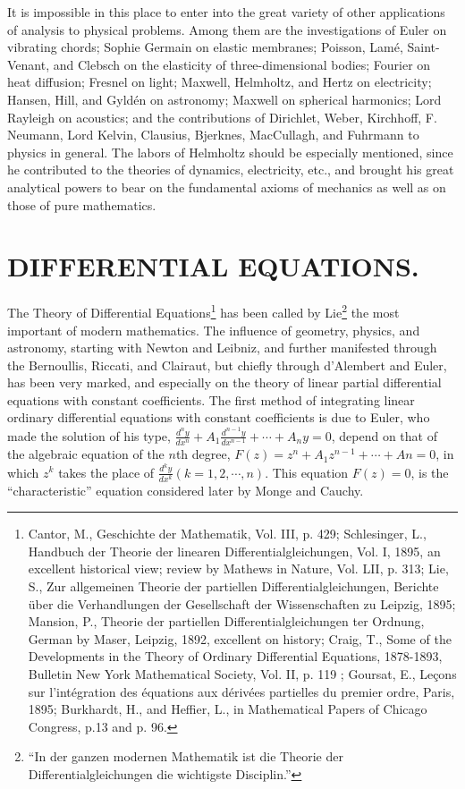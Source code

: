 \documentclass[oneside]{book}
\begin{document}
It is impossible in this place to enter into the great variety of
other applications of analysis to physical problems. Among them are
the investigations of Euler on vibrating chords; Sophie Germain on
elastic membranes; Poisson, Lam\'e, Saint-Venant, and Clebsch on
the elasticity of three-dimensional bodies; Fourier on heat
diffusion; Fresnel on light; Maxwell, Helmholtz, and Hertz on
electricity; Hansen, Hill, and Gyld\'en on astronomy; Maxwell on
spherical harmonics; Lord Rayleigh on acoustics; and the
contributions of Dirichlet, Weber, Kirchhoff, F. Neumann, Lord
Kelvin, Clausius, Bjerknes, MacCullagh, and Fuhrmann to physics in
general. The labors of Helmholtz should be especially mentioned,
since he contributed to the theories of dynamics, electricity, etc.,
and brought his great analytical powers to bear on the fundamental
axioms of mechanics as well as on those of pure mathematics.

\chapter{DIFFERENTIAL EQUATIONS.}

The Theory of Differential Equations\footnote{Cantor, M.,
Geschichte der Mathematik, Vol. III, p. 429; Schlesinger, L.,
Handbuch der
Theorie der linearen Differentialgleichungen, Vol. I, 1895, an
excellent historical view; review by Mathews in Nature, Vol. LII,
p. 313; Lie, S., Zur allgemeinen Theorie der partiellen
Differentialgleichungen, Berichte \"uber die Verhandlungen der
Gesellschaft der Wissenschaften zu Leipzig, 1895; Mansion, P.,
Theorie der partiellen Differentialgleichungen ter Ordnung, German
by Maser, Leipzig, 1892, excellent on history; Craig, T., Some of
the Developments in the Theory of Ordinary Differential Equations,
1878-1893, Bulletin New York Mathematical Society, Vol. II, p. 119 ;
Goursat, E., Le\c{c}ons sur l'int\'egration des \'equations aux
d\'eriv\'ees partielles du premier ordre, Paris, 1895; Burkhardt,
H., and Heffier, L., in Mathematical Papers of Chicago Congress,
p.13 and p. 96.} has been called by Lie\footnote{``In der ganzen
modernen Mathematik ist die Theorie der Differentialgleichungen die
wichtigste Disciplin.''} the most important of modern
mathematics. The influence of geometry, physics, and astronomy,
starting with Newton and Leibniz, and further manifested through the
Bernoullis, Riccati, and Clairaut, but chiefly through d'Alembert
and Euler, has been very marked, and especially on the theory of
linear partial differential equations with constant coefficients.
The first method of integrating linear ordinary differential
equations with constant coefficients is due to Euler, who made the
solution of his type, $\frac {d^{n}y} {dx^{n}} + A_{1}\frac
{d^{n-1}y} {dx^{n-1}} + \cdots + A_{n}y = 0$, depend on that of the
algebraic equation of the
$n$th degree, $F(z) = z^{n} + A_{1}z^{n-1} + \cdots + An = 0$, in
which $z^{k}$ takes the place of $\frac {d^{k}y} {dx^{k}} (k = 1, 2,
\cdots, n)$. This equation $F(z) = 0$, is the ``characteristic''
equation considered later by Monge and Cauchy.
\end{document}
